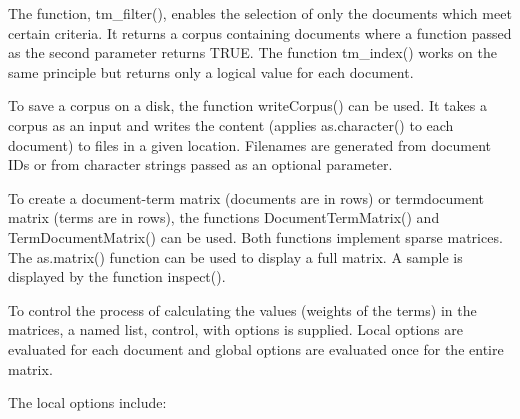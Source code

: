 \documentclass[10pt]{book}
\begin{document}
The function, tm\_filter(), enables the selection of only the documents which meet certain criteria. It returns a corpus containing documents where a function passed as the second parameter returns TRUE. The function tm\_index() works on the same principle but returns only a logical value for each document.

To save a corpus on a disk, the function writeCorpus() can be used. It takes a corpus as an input and writes the content (applies as.character() to each document) to files in a given location. Filenames are generated from document IDs or from character strings passed as an optional parameter.

To create a document-term matrix (documents are in rows) or termdocument matrix (terms are in rows), the functions DocumentTermMatrix() and TermDocumentMatrix() can be used. Both functions implement sparse matrices. The as.matrix() function can be used to display a full matrix. A sample is displayed by the function inspect().

To control the process of calculating the values (weights of the terms) in the matrices, a named list, control, with options is supplied. Local options are evaluated for each document and global options are evaluated once for the entire matrix.

The local options include:
\end{document}
